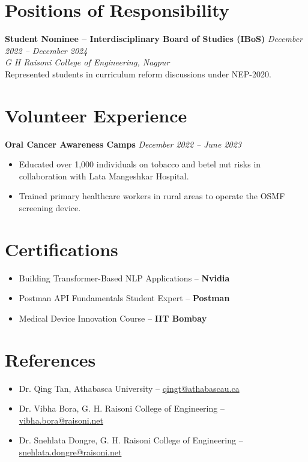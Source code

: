 \documentclass[10pt, letterpaper]{article}
\begin{document}
\section{Positions of Responsibility}
\textbf{Student Nominee -- Interdisciplinary Board of Studies (IBoS)} \hfill \textit{December 2022 -- December 2024} \\
\textit{G H Raisoni College of Engineering, Nagpur} \\
Represented students in curriculum reform discussions under NEP-2020.

\section{Volunteer Experience}
\textbf{Oral Cancer Awareness Camps} \hfill \textit{December 2022 -- June 2023}
\begin{itemize}[leftmargin=*, noitemsep, topsep=2pt]
    \item Educated over 1,000 individuals on tobacco and betel nut risks in collaboration with Lata Mangeshkar Hospital.
    \item Trained primary healthcare workers in rural areas to operate the OSMF screening device.
\end{itemize}

\section{Certifications}
\begin{itemize}[leftmargin=*, noitemsep, topsep=2pt]
    \item Building Transformer-Based NLP Applications -- \textbf{Nvidia}
    \item Postman API Fundamentals Student Expert -- \textbf{Postman}
    \item Medical Device Innovation Course -- \textbf{IIT Bombay}
\end{itemize}

\section{References}
\begin{itemize}[leftmargin=*, noitemsep, topsep=2pt]
    \item Dr. Qing Tan, Athabasca University -- \href{mailto:qingt@athabascau.ca}{qingt@athabascau.ca}
    \item Dr. Vibha Bora, G. H. Raisoni College of Engineering -- \href{mailto:vibha.bora@raisoni.net}{vibha.bora@raisoni.net}
    \item Dr. Snehlata Dongre, G. H. Raisoni College of Engineering -- \href{mailto:snehlata.dongre@raisoni.net}{snehlata.dongre@raisoni.net}
\end{itemize}
\end{document}
